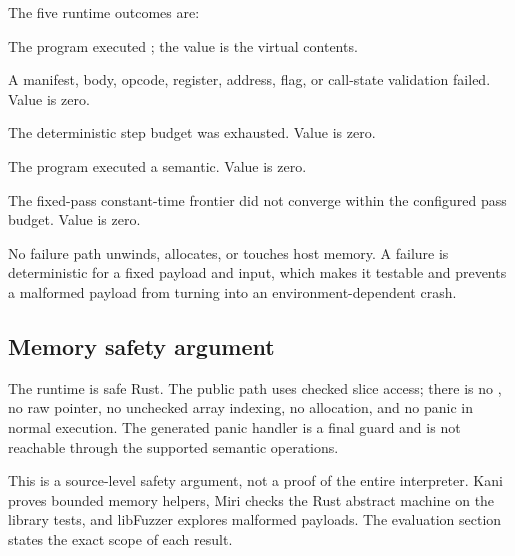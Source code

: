 The five runtime outcomes are:

\begin{description}[leftmargin=1.2em,style=nextline]
  \item[\code{Returned}] The program executed ; the value is the
        virtual  contents.
  \item[\code{BadPayload}] A manifest, body, opcode, register, address, flag, or
        call-state validation failed. Value is zero.
  \item[\code{FuelExhausted}] The deterministic step budget was exhausted.
        Value is zero.
  \item[\code{Trap}] The program executed a  semantic. Value is
        zero.
  \item[\code{LoopBound}] The fixed-pass constant-time frontier did not
        converge within the configured pass budget. Value is zero.
\end{description}

No failure path unwinds, allocates, or touches host memory. A failure is
deterministic for a fixed payload and input, which makes it testable and prevents
a malformed payload from turning into an environment-dependent crash.

\subsection{Memory safety argument}

The runtime is safe Rust. The public path uses checked slice access; there is no
, no raw pointer, no unchecked array indexing, no allocation, and no
panic in normal execution. The generated panic handler is a final 
guard and is not reachable through the supported semantic operations.

This is a source-level safety argument, not a proof of the entire interpreter.
Kani proves bounded memory helpers, Miri checks the Rust abstract machine on the
library tests, and libFuzzer explores malformed payloads. The evaluation section
states the exact scope of each result.
